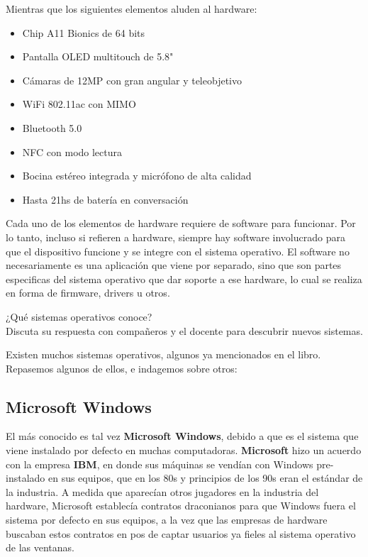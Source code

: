 Mientras que los siguientes elementos aluden al hardware:

\begin{itemize}
    \item Chip A11 Bionics de 64 bits
    \item Pantalla OLED multitouch de 5.8"
    \item Cámaras de 12MP con gran angular y teleobjetivo
    \item WiFi 802.11ac con MIMO
    \item Bluetooth 5.0
    \item NFC con modo lectura
    \item Bocina estéreo integrada y micrófono de alta calidad
    \item Hasta 21hs de batería en conversación
\end{itemize}

Cada uno de los elementos de hardware requiere de software para funcionar. Por
lo tanto, incluso si refieren a hardware, siempre hay software involucrado para
que el dispositivo funcione y se integre con el sistema operativo. El software
no necesariamente es una aplicación que viene por separado, sino que son partes
especificas del sistema operativo que dar soporte a ese hardware, lo cual se
realiza en forma de firmware, drivers u otros.
\vspace{1cm}

\begin{exercise}
¿Qué sistemas operativos conoce?\\
Discuta su respuesta con compañeros y el docente para descubrir nuevos sistemas.
\end{exercise}


Existen muchos sistemas operativos, algunos ya mencionados en el libro.
Repasemos algunos de ellos, e indagemos sobre otros:

\subsection*{Microsoft Windows}

El más conocido es tal vez \textbf{Microsoft Windows}, debido a que es el
sistema que viene instalado por defecto en muchas computadoras.
\textbf{Microsoft} hizo un acuerdo con la empresa \textbf{IBM}, en donde sus
máquinas se vendían con Windows pre-instalado en sus equipos, que en los 80s y
principios de los 90s eran el estándar de la industria. A medida que aparecían
otros jugadores en la industria del hardware, Microsoft establecía contratos
draconianos para que Windows fuera el sistema por defecto en sus equipos, a la
vez que las empresas de hardware buscaban estos contratos en pos de captar
usuarios ya fieles al sistema operativo de las ventanas.

